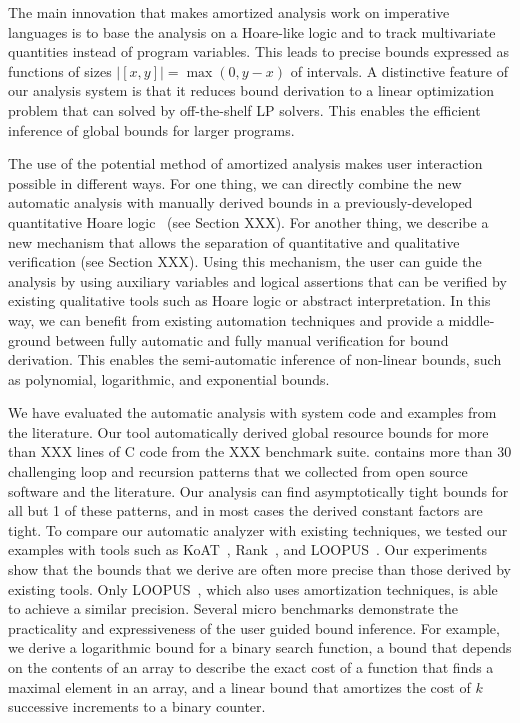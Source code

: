 \documentclass[nocopyrightspace,preprint,pldi]{sigplanconf-pldi15}
\newcommand{\iffull}[2]{\ifx\fullversion\undefined{#2}\else{#1}\fi}
\newcommand{\pref}[1]{\prettyref{#1}}
\begin{document}
The main innovation that makes amortized analysis work
on imperative languages is to base the analysis on a
Hoare-like logic and to track multivariate quantities instead
of program variables.  This leads to precise bounds
expressed as functions of sizes $|[x, y]| = \max(0, y-x)$ of
intervals.
%
A distinctive feature of our analysis system is that
it reduces bound derivation to a linear optimization problem
that can solved by off-the-shelf LP solvers.  This enables the
efficient inference of global bounds for larger programs.

The use of the potential method of amortized analysis makes user
interaction possible in different ways. For one thing, we can directly
combine the new automatic analysis with manually derived bounds in a
previously-developed quantitative Hoare logic~\cite{veristack14} (see
Section XXX).  For another thing, we describe a new mechanism that
allows the separation of quantitative and qualitative verification
(see Section XXX).  Using this mechanism, the user can guide the
analysis by using auxiliary variables and logical assertions that can
be verified by existing qualitative tools such as Hoare logic or
abstract interpretation.  In this way, we can benefit from existing
automation techniques and provide a middle-ground between fully
automatic and fully manual verification for bound derivation. This
enables the semi-automatic inference of non-linear bounds, such as
polynomial, logarithmic, and exponential bounds.

We have evaluated the automatic analysis with system code and examples
from the literature.  Our tool automatically derived global resource
bounds for more than XXX lines of C code from the XXX benchmark suite.
%
\iffull{\pref{app:cat}}{The extended version
  of this article~\cite{anon_extended}}{} contains more than $30$
challenging loop and recursion patterns that we collected from open
source software and the literature.  Our analysis can find
asymptotically tight bounds for all but 1 of these patterns, and in
most cases the derived constant factors are tight.  To compare our
automatic analyzer with existing techniques, we tested our examples
with tools such as KoAT~\cite{BrockschmidtEFFG14},
Rank~\cite{AliasDFG10}, and LOOPUS~\cite{SinnZV14}.  Our experiments
show that the bounds that we derive are often more precise than those
derived by existing tools.  Only LOOPUS~\cite{SinnZV14}, which also
uses amortization techniques, is able to achieve a similar precision.
%
Several micro benchmarks demonstrate the practicality and
expressiveness of the user guided bound inference.  For example, we
derive a logarithmic bound for a binary search function, a bound that
depends on the contents of an array to describe the exact cost of a
function that finds a maximal element in an array, and a linear
bound that amortizes the cost of $k$ successive increments to a binary
counter.
\end{document}
